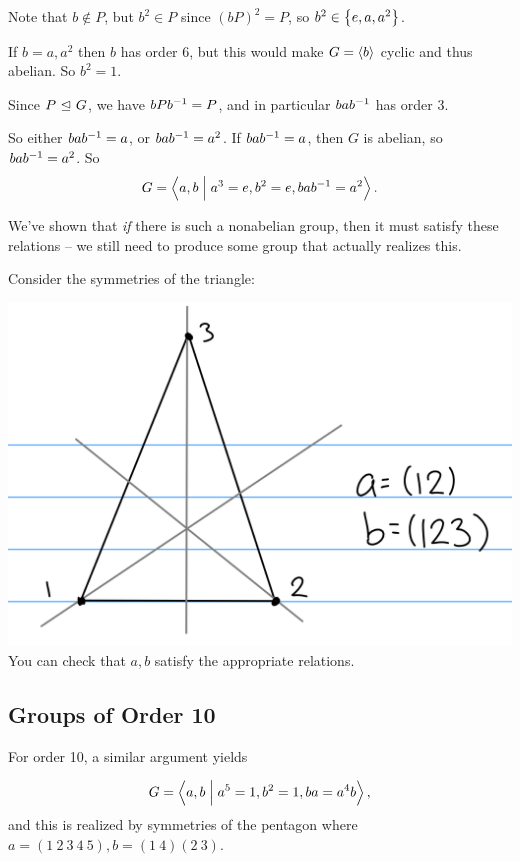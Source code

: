 Note that \(b\not\in P\), but \(b^2 \in P\) since \((bP)^2 = P\), so
\(b^2 \in \left\{{e, a, a^2}\right\}\).

If \(b=a, a^2\) then \(b\) has order 6, but this would make
\(G = \left\langle{b}\right\rangle\) cyclic and thus abelian. So \(b^2=1\).

Since \(P {~\trianglelefteq~} G\), we have \(bPb^{-1} = P\), and in particular
\(bab^{-1}\) has order 3.

So either \(bab^{-1} = a\), or \(bab^{-1} = a^2\). If \(bab^{-1} = a\),
then \(G\) is abelian, so \(bab^{-1} = a^2\). So
\begin{align*}
G = \left\langle{a, b \mathrel{\Big|}a^3 = e, b^2 = e, bab^{-1}= a^2}\right\rangle
.\end{align*}

We've shown that \emph{if} there is such a nonabelian group, then it
must satisfy these relations -- we still need to produce some group that
actually realizes this.

Consider the symmetries of the triangle:

\includegraphics{figures/2019-09-03-09:52.png}\\

You can check that \(a,b\) satisfy the appropriate relations.

\hypertarget{groups-of-order-10}{%
\subsection{Groups of Order 10}\label{groups-of-order-10}}

For order 10, a similar argument yields

\begin{align*}
G = \left\langle{a, b \mathrel{\Big|}a^5 = 1, b^2 = 1, ba=a^4b}\right\rangle
,\end{align*} and this is realized by symmetries of the pentagon where
\(a = (1~2~3~4~5), b=(1~4)(2~3)\).

